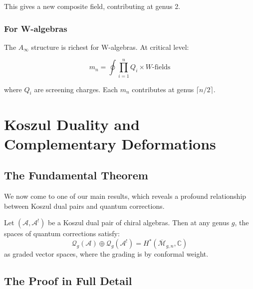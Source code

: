 This gives a new composite field, contributing at genus 2.

\subsubsection{For W-algebras}

The $A_\infty$ structure is richest for W-algebras. At critical level:

$$m_n = \oint \prod_{i=1}^n Q_i \times W\text{-fields}$$

where $Q_i$ are screening charges. Each $m_n$ contributes at genus $\lceil n/2 \rceil$.

\section{Koszul Duality and Complementary Deformations}

\subsection{The Fundamental Theorem}

We now come to one of our main results, which reveals a profound relationship between Koszul dual pairs and quantum corrections.

\begin{theorem}
Let $(\mathcal{A}, \mathcal{A}^!)$ be a Koszul dual pair of chiral algebras. Then at any genus $g$, the spaces of quantum corrections satisfy:
$$\mathcal{Q}_g(\mathcal{A}) \oplus \mathcal{Q}_g(\mathcal{A}^!) = H^*(\overline{\mathcal{M}}_{g,n}, \mathbb{C})$$
as graded vector spaces, where the grading is by conformal weight.
\end{theorem}

\subsection{The Proof in Full Detail}

